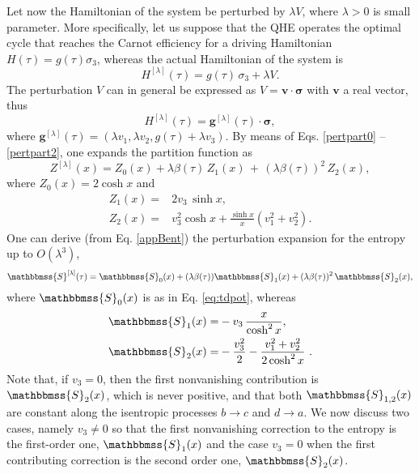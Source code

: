 \documentclass[aps,pra,floatfix,twocolumn,groupedaddress,superscriptaddress,nofootinbib,notitlepage,amsmath,amssymb,]{revtex4-1}
\begin{document}
Let now the Hamiltonian of the system be perturbed by  $\lambda V$, where $\lambda>0$ is small parameter. More specifically, let us suppose that the QHE operates the optimal cycle that reaches the Carnot efficiency for a driving Hamiltonian $H(\tau)=g(\tau) \sigma_3$, whereas the actual Hamiltonian of the system is
%
\begin{equation}
\label{1qHampert0}
H^{[\lambda]}(\tau) =  g(\tau)\,\sigma_3 +\lambda V.
\end{equation}
%
The perturbation $V$ can in general be expressed as $V = \bm{v}\cdot \bm{\sigma}$ with $\bm{v}$ a real vector, thus
%
\begin{equation}
 \label{1qHampert1}
 H^{[\lambda]}(\tau)=\bm{g}^{[\lambda]}(\tau)\cdot\bm{\sigma},
 \end{equation}
where $ \bm{g}^{[\lambda]}(\tau)=(\lambda v_1,\lambda v_2,g(\tau)+\lambda v_3)$. By means of Eqs. \eqref{pertpart0} -- \eqref{pertpart2}, one expands the partition function as
\begin{equation}
Z^{[\lambda]}(x)=Z_0(x)+\lambda\beta(\tau)\,Z_1(x)\,+\,(\lambda\beta(\tau))^2\,Z_2(x),
\end{equation}
where $Z_0(x)=2\cosh x$ and  
\begin{align}
\label{1qpartpert1}
Z_1(x)=&2v_3\,\sinh x,\\
\label{1qpartpert2}
Z_2(x)=&v_3^2 \cosh x+\frac{\sinh x}{x}(v_1^2+v_2^2).
\end{align}
One can derive (from Eq. \eqref{appBent}) the perturbation expansion for the entropy up to $O(\lambda^3)$,
\begin{equation}
\mathbbmss{S}^{[\lambda]}(\tau) = \mathbbmss{S}_0(x) + (\lambda\beta(\tau)) \mathbbmss{S}_1(x) +(\lambda\beta(\tau))^{2} \,\mathbbmss{S}_2(x),
\end{equation}
where $\mathbbmss{S}_0(x)$ is as in Eq. \eqref{eq:tdpot}, whereas
\begin{align}
\label{subeq3}
\mathbbmss{S}_1(x)=& - v_3 \,\frac{x}{\cosh^2x},\\
\label{eq:entr2} 
\mathbbmss{S}_2(x)=& -\frac{v_3^2}{2}-\frac{v_1^2+v_2^2}{2\cosh^2 x}\ .
\end{align}
Note that, if $v_3=0$, then the first nonvanishing contribution is $\mathbbmss{S}_2(x)$, which is never positive, and that both $\mathbbmss{S}_{1,2}(x)$ are constant along the isentropic processes $b\to c$ and $d\to a$. We now discuss two cases, namely $v_3\neq 0$ so that the first nonvanishing correction to the entropy is the first-order one, $\mathbbmss{S}_1(x)$ and the case $v_3=0$ when the first contributing correction is  the second order one, $\mathbbmss{S}_2(x)$. 
\end{document}
